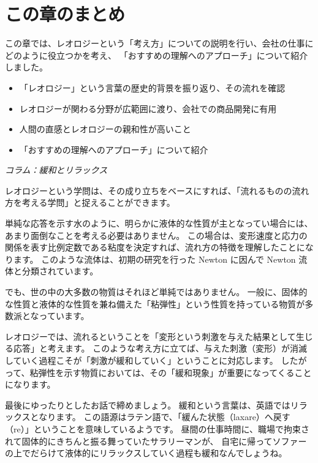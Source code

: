 \documentclass[uplatex,dvipdfmx,a4paper,11pt]{jsreport}
\begin{document}
\section{この章のまとめ}
この章では、レオロジーという「考え方」についての説明を行い、会社の仕事にどのように役立つかを考え、
「おすすめの理解へのアプローチ」について紹介しました。
\begin{boxnote}
	\large
	\begin{itemize}
		\item 「レオロジー」という言葉の歴史的背景を振り返り、その流れを確認
		\item レオロジーが関わる分野が広範囲に渡り、会社での商品開発に有用
		\item 人間の直感とレオロジーの親和性が高いこと
		\item 「おすすめの理解へのアプローチ」について紹介
	\end{itemize}
\end{boxnote}

\newpage

\begin{longartdeco}
	\begin{center}
	\emph{コラム：緩和とリラックス}	
	\end{center}

	レオロジーという学問は、その成り立ちをベースにすれば、「流れるものの流れ方を考える学問」と捉えることができます。
	
	単純な応答を示す水のように、明らかに液体的な性質が主となってい場合には、あまり面倒なことを考える必要はありません。
	この場合は、変形速度と応力の関係を表す比例定数である粘度を決定すれば、流れ方の特徴を理解したことになります。
	このような流体は、初期の研究を行った Newton に因んで Newton 流体と分類されています。
	
	でも、世の中の大多数の物質はそれほど単純ではありません。
	一般に、固体的な性質と液体的な性質を兼ね備えた「粘弾性」という性質を持っている物質が多数派となっています。
	
	レオロジーでは、流れるということを「変形という刺激を与えた結果として生じる応答」と考えます。
	このような考え方に立てば、与えた刺激（変形）が消滅していく過程こそが「刺激が緩和していく」ということに対応します。
	したがって、粘弾性を示す物質においては、その「緩和現象」が重要になってくることになります。
	
	最後にゆったりとしたお話で締めましょう。
	緩和という言葉は、英語ではリラックスとなります。
	この語源はラテン語で、「緩んた状態（laxare）へ戻す（re）」ということを意味しているようです。
	昼間の仕事時間に、職場で拘束されて固体的にきちんと振る舞っていたサラリーマンが、
	自宅に帰ってソファーの上でだらけて液体的にリラックスしていく過程も緩和なんでしょうね。

\end{longartdeco}
\end{document}
